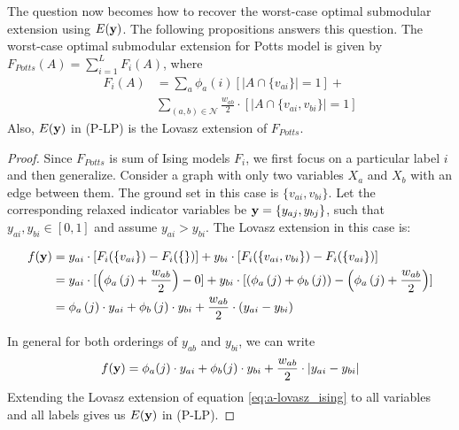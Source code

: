 The question now becomes how to recover the worst-case optimal submodular extension using $E({\bf y})$. The following propositions answers this question.
{\proposition The worst-case optimal  submodular extension for Potts model is given by $F_{Potts}(A) = \sum_{i = 1}^L F_i(A)$, where
\begin{align}
    F_i(A) &= \sum_a \phi_{a}(i) [|A \cap \{v_{ai}\}| = 1] + \nonumber \\
           &\sum_{(a, b) \in {\mathcal N}} \frac{w_{ab}}{2} \cdot [|A \cap \{v_{ai}, v_{bi}\}| = 1]
\end{align}
Also, $E({\bf y})$ in (P-LP) is the Lovasz extension of $F_{Potts}$.
\label{proposition:potts_worst-case optimal}}
\begin{proof}
Since $F_{Potts}$ is sum of Ising models $F_i$, we first focus on a particular label $i$ and then generalize. Consider a graph with only two variables $X_a$ and $X_b$ with an edge between them. The ground set in this case is $\{v_{ai}, v_{bi}\}$. Let the corresponding relaxed indicator variables be ${\bf y} = \{y_{aj}, y_{bj}\}$, such that $y_{ai}, y_{bi} \in [0, 1]$ and assume $y_{ai} > y_{bi}$. The Lovasz extension in this case is:

\begin{align}
f({\bf y}) &= y_{ai} \cdot [F_i(\{v_{ai}\}) - F_i(\{\})] + y_{bi} \cdot [F_i(\{v_{ai}, v_{bi}\}) - F_i(\{v_{ai}\})] \nonumber \\
&= y_{ai} \cdot [\left(\phi_{a}\left(j\right) + \frac{w_{ab}}{2}\right) - 0] + y_{bi} \cdot [\left(\phi_{a}\left(j\right) + \phi_{b}\left(j\right)\right) - \left(\phi_{a}\left(j\right) + \frac{w_{ab}}{2}\right)] \nonumber \\
&=  \phi_{a}\left(j\right) \cdot y_{ai} + \phi_{b}\left(j\right) \cdot y_{bi} + \frac{w_{ab}}{2} \cdot \left(y_{ai} - y_{bi}\right)
\end{align}

In general for both orderings of $y_{ab}$ and $y_{bi}$, we can write
%
\begin{equation}
f({\bf y}) = \phi_{a}(j) \cdot y_{ai} + \phi_{b}(j) \cdot y_{bi} + \frac{w_{ab}}{2} \cdot |y_{ai} - y_{bi}|
\label{eq:a-lovasz_ising}
\end{equation}
%
Extending the Lovasz extension of equation \eqref{eq:a-lovasz_ising} to all variables and all labels gives us $E({\bf y})$ in (P-LP). 

\end{proof}
\vspace{-1mm}

